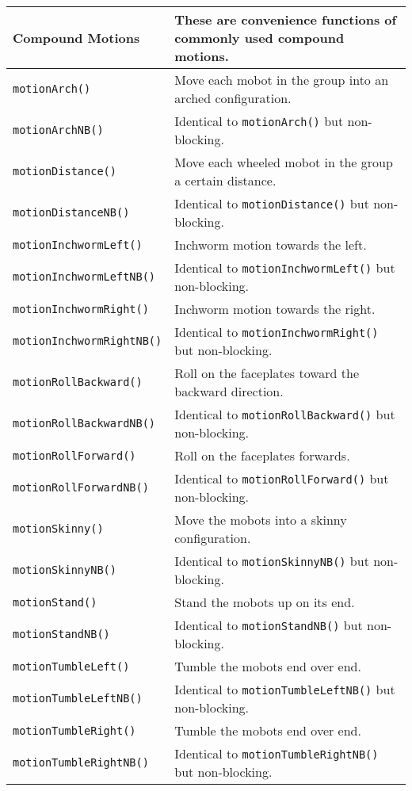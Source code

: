\begin{tabular}{p{1.75in}p{4.5in}}
Compound Motions & These are convenience functions of commonly used compound motions. \\
\hline
\texttt{motionArch()}  & Move each mobot in the group into an arched configuration. \\
\texttt{motionArchNB()}  & Identical to \texttt{motionArch()} but non-blocking. \\
\texttt{motionDistance()}  & Move each wheeled mobot in the group a certain distance. \\
\texttt{motionDistanceNB()}  & Identical to \texttt{motionDistance()} but non-blocking. \\
\texttt{motionInchwormLeft()}  & Inchworm motion towards the left. \\
\texttt{motionInchwormLeftNB()}  & Identical to \texttt{motionInchwormLeft()} but non-blocking. \\
\texttt{motionInchwormRight()}  & Inchworm motion towards the right. \\
\texttt{motionInchwormRightNB()}  & Identical to \texttt{motionInchwormRight()} but non-blocking. \\
\texttt{motionRollBackward()}  & Roll on the faceplates toward the backward direction. \\
\texttt{motionRollBackwardNB()}  & Identical to \texttt{motionRollBackward()} but non-blocking. \\
\texttt{motionRollForward()}  & Roll on the faceplates forwards. \\
\texttt{motionRollForwardNB()}  & Identical to \texttt{motionRollForward()} but non-blocking. \\
\texttt{motionSkinny()}  & Move the mobots into a skinny configuration. \\
\texttt{motionSkinnyNB()}  & Identical to \texttt{motionSkinnyNB()} but non-blocking. \\
\texttt{motionStand()}  & Stand the mobots up on its end. \\
\texttt{motionStandNB()}  & Identical to \texttt{motionStandNB()} but non-blocking. \\
\texttt{motionTumbleLeft()}  & Tumble the mobots end over end. \\
\texttt{motionTumbleLeftNB()}  & Identical to \texttt{motionTumbleLeftNB()} but non-blocking. \\
\texttt{motionTumbleRight()}  & Tumble the mobots end over end. \\
\texttt{motionTumbleRightNB()}  & Identical to \texttt{motionTumbleRightNB()} but non-blocking. \\

\end{tabular}

